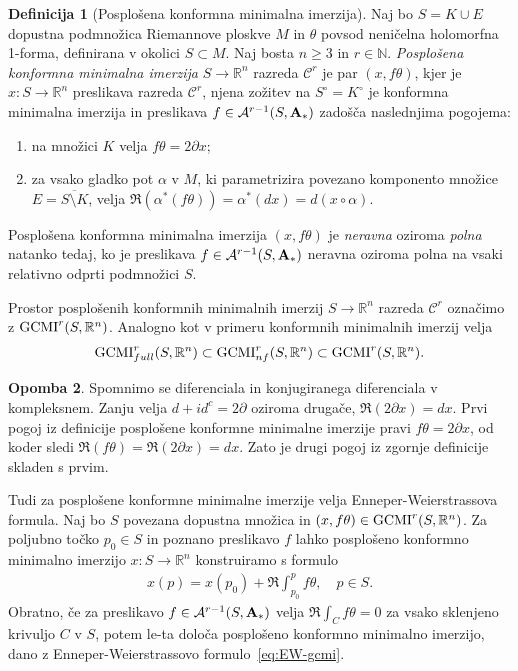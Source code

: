 \documentclass[12pt,a4paper,twoside]{article}
\theoremstyle{definition} %
\newtheorem{definicija}{Definicija}[section]
\newtheorem{opomba}[definicija]{Opomba}
\theoremstyle{plain} %
\numberwithin{equation}{section}  %
\newcommand{\R}{\mathbb R}
\newcommand{\N}{\mathbb N}
\begin{document}
\begin{definicija} [Posplošena konformna minimalna imerzija]
Naj bo $S = K \cup E$ dopustna podmnožica Riemannove ploskve $M$ in $\theta$ povsod neničelna holomorfna 1-forma, definirana v okolici $S \subset M$.
Naj bosta $n \geq 3$ in $r \in \N$. \emph{Posplošena konformna minimalna imerzija} $S \to \R^{n}$ razreda $\mathcal{C}^{r}$ je par $(x, f \theta)$, kjer je $x \colon S \to \R^{n}$ preslikava razreda  $\mathcal{C}^{r}$, njena zožitev na $S^\circ = K^\circ$ je konformna minimalna imerzija in preslikava $f \in \mathcal{A}^{r-1}(S, \textbf{\textup{A}}_{*})$ zadošča naslednjima pogojema:
\begin{enumerate}
\item na množici $K$ velja $f \theta = 2 \partial x$;
\item za vsako gladko pot $\alpha$ v $M$, ki parametrizira povezano komponento množice $E = \overline{S \setminus K}$, velja $ \Re(\alpha^{*}(f \theta)) = \alpha^{*}(dx) = d(x \circ \alpha)$.
\end{enumerate}
%
Posplošena konformna minimalna imerzija $(x, f \theta)$ je \emph{neravna} oziroma \emph{polna} natanko tedaj, ko je preslikava $f \in \mathcal{A}^{r-1}(S, \textbf{\textup{A}}_{*})$ neravna oziroma polna na vsaki relativno odprti podmnožici $S$.
\end{definicija}

Prostor posplošenih konformnih minimalnih imerzij $S \to \R^{n}$ razreda $\mathcal{C}^{r}$ označimo z $\textup{GCMI}^{r}(S, \R^{n})$. Analogno kot v primeru konformnih minimalnih imerzij velja 
\begin{gather*}
\textup{GCMI}_{full}^{r}(S, \R^{n}) \subset \textup{GCMI}_{nf}^{r}(S, \R^{n}) \subset \textup{GCMI}^{r}(S, \R^{n}).
\end{gather*}

\begin{opomba}
Spomnimo se diferenciala in konjugiranega diferenciala v kompleksnem. Zanju velja $d + i d^{c} = 2 \partial$ oziroma drugače, $\Re(2 \partial x) = dx$.
Prvi pogoj iz definicije posplošene konformne minimalne imerzije pravi $f \theta = 2 \partial x$, od koder sledi $\Re(f \theta) = \Re(2 \partial x) = dx$. Zato je drugi pogoj iz zgornje definicije skladen s prvim.
\end{opomba}

Tudi za posplošene konformne minimalne imerzije velja Enneper-Weierstrassova formula.
Naj bo $S$ povezana dopustna množica in $(x, f \theta) \in \textup{GCMI}^{r}(S, \R^{n})$. Za poljubno točko $p_{0} \in S$ in poznano preslikavo $f$ lahko posplošeno konformno minimalno imerzijo $x \colon S \to \R^{n}$ konstruiramo s formulo
\begin{gather} \label{eq:EW-gcmi}
x(p) = x(p_{0}) + \Re \int_{p_0}^{p} f \theta, \quad p \in S.
\end{gather} 
Obratno, če za preslikavo $f \in \mathcal{A}^{r-1}(S, \textbf{\textup{A}}_{*})$ velja $ \Re \int_{C} f \theta = 0$ za vsako sklenjeno krivuljo $C$ v $S$, potem le-ta določa posplošeno konformno minimalno imerzijo, dano z Enneper-Weierstrassovo formulo~\eqref{eq:EW-gcmi}.
\end{document}
